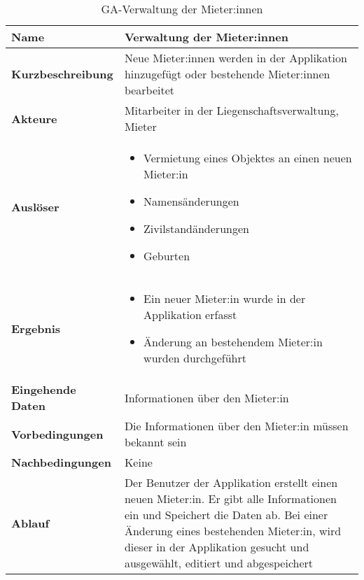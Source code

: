 \begin{table}[H]
  \centering
  \settowidth{}
  \setlength\extrarowheight{2pt}
  \begin{tabulary}{1.0\textwidth}{|a|m{12cm}|}
    \hline
    \textbf{Name}& Verwaltung der Mieter:innen\\
    \hline 
    \textbf{Kurzbeschreibung} & Neue Mieter:innen werden in der Applikation hinzugefügt oder bestehende Mieter:innen bearbeitet\\
    \hline
    \textbf{Akteure} & Mitarbeiter in der Liegenschaftsverwaltung, Mieter\\
    \hline
    \textbf{Auslöser} & 
    \begin{itemize}
      \item Vermietung eines Objektes an einen neuen Mieter:in
      \item Namensänderungen
      \item Zivilstandänderungen
      \item Geburten
    \end{itemize}\\
    \hline
    \textbf{Ergebnis} & \begin{itemize}
      \item Ein neuer Mieter:in wurde in der Applikation erfasst
      \item Änderung an bestehendem Mieter:in wurden durchgeführt
    \end{itemize}\\
    \hline
    \textbf{Eingehende Daten} & Informationen über den Mieter:in\\
    \hline
    \textbf{Vorbedingungen} & Die Informationen über den Mieter:in müssen bekannt sein\\
    \hline
    \textbf{Nachbedingungen} & Keine\\
    \hline
    \textbf{Ablauf} & Der Benutzer der Applikation erstellt einen neuen Mieter:in. Er gibt alle Informationen ein und Speichert die Daten ab. Bei einer Änderung eines bestehenden Mieter:in, wird dieser in der Applikation gesucht und ausgewählt, editiert und abgespeichert\\
    \hline
  \end{tabulary}
  \caption{GA-Verwaltung der Mieter:innen}
\end{table}

